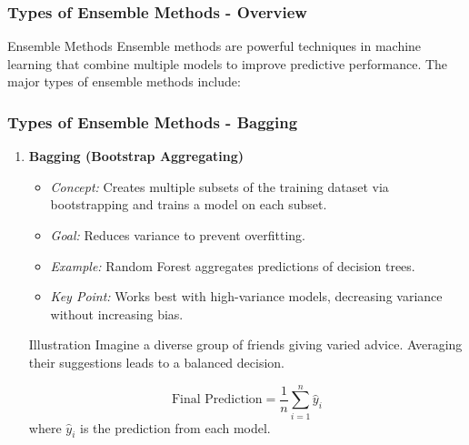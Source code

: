 \documentclass[aspectratio=169]{beamer}
\begin{document}
\begin{frame}[fragile]
  \frametitle{Types of Ensemble Methods - Overview}
  \begin{block}{Ensemble Methods}
    Ensemble methods are powerful techniques in machine learning that combine multiple models to improve predictive performance. The major types of ensemble methods include:
  \end{block}
\end{frame}

\begin{frame}[fragile]
  \frametitle{Types of Ensemble Methods - Bagging}
  \begin{enumerate}
    \item \textbf{Bagging (Bootstrap Aggregating)}
      \begin{itemize}
        \item \textit{Concept:} Creates multiple subsets of the training dataset via bootstrapping and trains a model on each subset.
        \item \textit{Goal:} Reduces variance to prevent overfitting.
        \item \textit{Example:} Random Forest aggregates predictions of decision trees.
        \item \textit{Key Point:} Works best with high-variance models, decreasing variance without increasing bias.
      \end{itemize}
      
      \begin{block}{Illustration}
        Imagine a diverse group of friends giving varied advice. Averaging their suggestions leads to a balanced decision.
      \end{block}

      \begin{equation}
      \text{Final Prediction} = \frac{1}{n} \sum_{i=1}^{n} \hat{y}_i
      \end{equation}
      where \( \hat{y}_i \) is the prediction from each model.
  \end{enumerate}
\end{frame}
\end{document}
